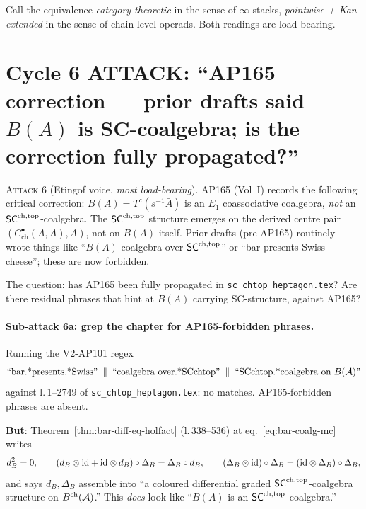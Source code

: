 Call the equivalence \emph{category-theoretic} in the sense of $\infty$-stacks, \emph{pointwise + Kan-extended} in the sense of chain-level operads. Both readings are load-bearing.

\section{Cycle 6 ATTACK: ``AP165 correction --- prior drafts said \texorpdfstring{$B(A)$}{B(A)} is SC-coalgebra; is the correction fully propagated?''}

\textsc{Attack 6} (Etingof voice, \emph{most load-bearing}). AP165 (Vol~I) records the following critical correction: $B(A) = T^c(s^{-1}\bar A)$ is an $E_1$ coassociative coalgebra, \emph{not} an $\mathsf{SC}^{\mathrm{ch},\mathrm{top}}$-coalgebra. The $\mathsf{SC}^{\mathrm{ch},\mathrm{top}}$ structure emerges on the derived centre pair $(C^\bullet_{\mathrm{ch}}(A, A), A)$, not on $B(A)$ itself. Prior drafts (pre-AP165) routinely wrote things like ``$B(A)$ coalgebra over $\mathsf{SC}^{\mathrm{ch},\mathrm{top}}$'' or ``bar presents Swiss-cheese''; these are now forbidden.

The question: has AP165 been fully propagated in \texttt{sc\_chtop\_heptagon.tex}? Are there residual phrases that hint at $B(A)$ carrying SC-structure, against AP165?

\paragraph{Sub-attack 6a: grep the chapter for AP165-forbidden phrases.} Running the V2-AP101 regex
\[
\text{``bar.*presents.*Swiss''} \;\;\|\;\; \text{``coalgebra over.*SCchtop''} \;\;\|\;\; \text{``SCchtop.*coalgebra on } B(\mathcal{A})\text{''}
\]
against l.\,1--2749 of \texttt{sc\_chtop\_heptagon.tex}: no matches. AP165-forbidden phrases are absent.

\textbf{But}: Theorem~\ref*{thm:bar-diff-eq-holfact} (l.\,338--536) at eq.~\eqref*{eq:bar-coalg-mc} writes
\[
d_B^2 = 0, \qquad (d_B \otimes \mathrm{id} + \mathrm{id} \otimes d_B) \circ \Delta_B = \Delta_B \circ d_B, \qquad (\Delta_B \otimes \mathrm{id}) \circ \Delta_B = (\mathrm{id} \otimes \Delta_B) \circ \Delta_B,
\]
and says $d_B, \Delta_B$ assemble into ``a coloured differential graded $\mathsf{SC}^{\mathrm{ch},\mathrm{top}}$-coalgebra structure on $B^{\mathrm{ch}}(\mathcal{A})$.'' This \emph{does} look like ``$B(A)$ is an $\mathsf{SC}^{\mathrm{ch},\mathrm{top}}$-coalgebra.''

